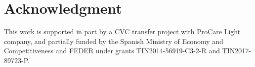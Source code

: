 \documentclass[10pt,a4paper,twocolumn,twoside]{article}
\begin{document}
\section{Acknowledgment}
This work is supported in part by a CVC transfer project with ProCare Light company, and partially funded by the Spanish Ministry of Economy and Competitiveness and FEDER under grants TIN2014-56919-C3-2-R and TIN2017-89723-P.




\appendix
\end{document}
